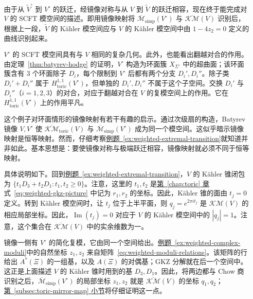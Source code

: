 \begin{example}
由于从 $\widetilde V^\circ$ 到 $V^\circ$ 的跃迁，经镜像对称与从 $V$ 到 $\widetilde V$ 的跃迁相容，现在终于能完成对 $V$ 的 SCFT 模空间的描述。即用镜像映射将 $\overline{\mathcal M}_{\mathrm{simp}}(V^\circ)$ 与 $\overline{\mathcal{KM}}(V)$ 识别后，根据上一段，$\widetilde V$ 的 Kähler 模空间应与 $V$ 的 Kähler 模空间中由 $1-4z_2=0$ 定义的曲线识别起来。

$V^\circ$ 的 SCFT 模空间具有与 $V$ 相同的复杂几何。此外，也能看出翻越对合的作用。由定理~\ref{thm:batyrev-hodge} 的证明，$V^\circ$ 构造为环面簇 $X_{\Sigma^\circ}$ 中的超曲面；该环面簇含有 3 个环面除子 $D_i$，每个限制到 $V^\circ$ 后都有两个分支 $D_i',D_i''$。除子类 $D_i'+D_i''$ 属于 $H^{1,1}_{\mathrm{toric}}(V^\circ)$，但单独的 $D_i',D_i''$ 不属于这个子空间。交换 $D_i'$ 与 $D_i''$（$i=1,2,3$）的对合，对应于翻越对合在 $V$ 的复模空间上的作用。它在 $H^{1,1}_{\mathrm{toric}}(V^\circ)$ 上的作用平凡。
\end{example}

这个例子对环面情形的镜像映射有若干有趣的启示。通过次级扇的构造，Batyrev 镜像 $V,V^\circ$ 使 $\overline{\mathcal{KM}}_{\mathrm{toric}}(V)$ 与 $\overline{\mathcal M}_{\mathrm{simp}}(V^\circ)$ 成为同一个模空间。这似乎暗示镜像映射是恒等映射。然而，仔细考察\hyperref[ex:weighted-extremal-transition]{例题~\ref*{ex:weighted-extremal-transition}}就知道并非如此。基本思想是：要使镜像对称与极端跃迁相容，镜像映射就必须不同于恒等映射。

具体说明如下。回到\hyperref[ex:weighted-extremal-transition]{例题~\ref*{ex:weighted-extremal-transition}}，$V$ 的 Kähler 锥闭包为 $\{t_1D_3+t_2D_1:t_1,t_2\geq0\}$。注意，这里的 $t_1,t_2$ 是\hyperref[chap:toric]{第~\ref*{chap:toric} 章}式~\eqref{eq:weighted-gkz-picture} 中记为 $r_1,r_2$ 的坐标。因此，Kähler 锥的面由 $t_j=0$ 定义。转到 Kähler 模空间时，让 $t_j$ 位于上半平面，则 $q_j=e^{2\pi it_j}$ 是 $\mathcal{KM}(V)$ 的相应局部坐标。因此，$\operatorname{Im}(t_j)=0$ 对应于 $V$ 的 Kähler 模空间中的 $|q_j|=1$。注意，这个集合在 $\overline{\mathcal{KM}}(V)$ 中的实余维数为一。

镜像一侧有 $V^\circ$ 的简化复模，它由同一个空间给出。\hyperref[ex:weighted-complex-moduli]{例题~\ref*{ex:weighted-complex-moduli}}中的自然坐标 $z_1,z_2$ 来自矩阵~\eqref{eq:weighted-moduli-relations}。该矩阵的行给出 $A^*(\Xi)$ 的一组基，以及 $A(\Xi)$ 的对偶基；GKZ 分解就在后一个空间中。这正是上面描述 $V$ 的 Kähler 锥时用到的基 $D_3,D_1$。因此，将两边都与 Chow 商识别之后，$\overline{\mathcal M}_{\mathrm{simp}}(V^\circ)$ 的局部坐标 $z_1,z_2$ 就是 $\overline{\mathcal{KM}}(V)$ 的坐标 $q_1,q_2$；\hyperref[subsec:toric-mirror-map]{第~\ref*{subsec:toric-mirror-map} 小节}将仔细证明这一点。

